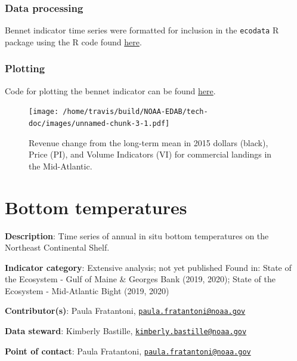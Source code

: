 \documentclass[
]{book}
\begin{document}
\hypertarget{data-processing-1}{%
\subsection{Data processing}\label{data-processing-1}}

Bennet indicator time series were formatted for inclusion in the \texttt{ecodata} R package using the R code found \href{https://raw.githubusercontent.com/NOAA-EDAB/ecodata/master/data-raw/get_bennet.R}{here}.

\hypertarget{plotting-1}{%
\subsection{Plotting}\label{plotting-1}}

Code for plotting the bennet indicator can be found \href{https://github.com/NOAA-EDAB/ecodata/blob/master/chunk-scripts/human_dimensions.Rmd-bennet.R}{here}.

\begin{figure}
\centering
\texttt{[image: /home/travis/build/NOAA-EDAB/tech-doc/images/unnamed-chunk-3-1.pdf]}
\caption{\label{fig:unnamed-chunk-3}Revenue change from the long-term mean in 2015 dollars (black), Price (PI), and Volume Indicators (VI) for commercial landings in the Mid-Atlantic.}
\end{figure}

\hypertarget{bottom-temperatures}{%
\chapter{Bottom temperatures}\label{bottom-temperatures}}

\textbf{Description}: Time series of annual in situ bottom temperatures on the Northeast Continental Shelf.

\textbf{Indicator category}: Extensive analysis; not yet published
Found in: State of the Ecosystem - Gulf of Maine \& Georges Bank (2019, 2020); State of the Ecosystem - Mid-Atlantic Bight (2019, 2020)

\textbf{Contributor(s)}: Paula Fratantoni, \href{mailto:paula.fratantoni@noaa.gov}{\nolinkurl{paula.fratantoni@noaa.gov}}

\textbf{Data steward}: Kimberly Bastille, \href{mailto:kimberly.bastille@noaa.gov}{\nolinkurl{kimberly.bastille@noaa.gov}}

\textbf{Point of contact}: Paula Fratantoni, \href{mailto:paula.fratantoni@noaa.gov}{\nolinkurl{paula.fratantoni@noaa.gov}}
\end{document}
